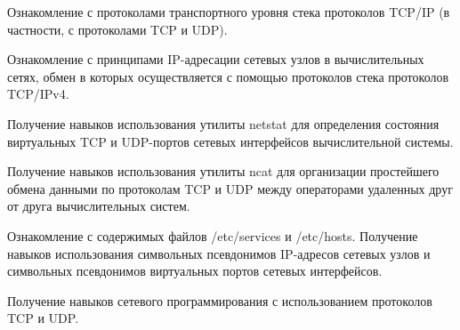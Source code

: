 
Ознакомление с протоколами транспортного уровня стека протоколов TCP/IP (в частности, с протоколами TCP и UDP).

Ознакомление с принципами IP-адресации сетевых узлов в вычислительных сетях, обмен в которых осуществляется с помощью протоколов стека протоколов TCP/IPv4.

Получение навыков использования утилиты netstat для определения состояния виртуальных TCP и UDP-портов сетевых интерфейсов вычислительной системы.

Получение навыков использования утилиты ncat для организации простейшего обмена данными по протоколам TCP и UDP
между операторами удаленных друг от друга вычислительных систем.

Ознакомление с содержимых файлов /etc/services и /etc/hosts. Получение навыков использования символьных псевдонимов IP-адресов сетевых узлов и
символьных псевдонимов виртуальных портов сетевых интерфейсов.

Получение навыков сетевого программирования с использованием протоколов TCP и UDP.


